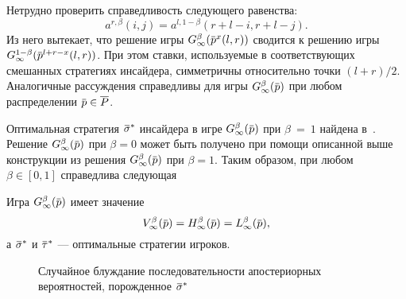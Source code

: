 {Нетрудно проверить справедливость следующего равенства:
\begin{equation*}
  a^{r, \beta}(i, j) = a^{l, 1-\beta}(r+l-i, r+l-j).
\end{equation*}
Из него вытекает, что решение игры $\theG[\infty](\p^x(l, r))$ сводится к решению игры $G^{1-\beta}_\infty(\p^{l+r-x}(l,r))$.
При этом ставки, используемые в соответствующих смешанных стратегиях инсайдера, симметричны относительно точки $(l+r)/2$.
Аналогичные рассуждения справедливы для игры $\theG[\infty](\p)$ при любом распределении $\p \in \MM$.

Оптимальная стратегия $\sigmav^*$ инсайдера в игре $\theG[\infty](\p)$ при $\beta~=~1$ найдена в~\cite{domansky11}.
Решение $\theG[\infty](\p)$ при $\beta = 0$ может быть получено при помощи описанной выше конструкции из решения $\theG[\infty](\p)$ при $\beta = 1$.
Таким образом, при любом $\beta \in [0, 1]$ справедлива следующая
\begin{theorem}
  \label{ch2:solution:theorem}
  Игра $\theG[\infty](\p)$ имеет значение
  \[
    \V[\infty](\p) = \High(\p) = \Low(\p),
  \]
  а $\sigmav^*$ и $\tauv^*$ --- оптимальные стратегии игроков.
\end{theorem}

\begin{figure}[tbh]
  \centering
  \caption[Последовательность апостериорных вероятностей]{Случайное блуждание последовательности апостериорных вероятностей, порожденное $\sigmav^*$}
  \label{ch2:fig:posterior-1}
\end{figure}

}
